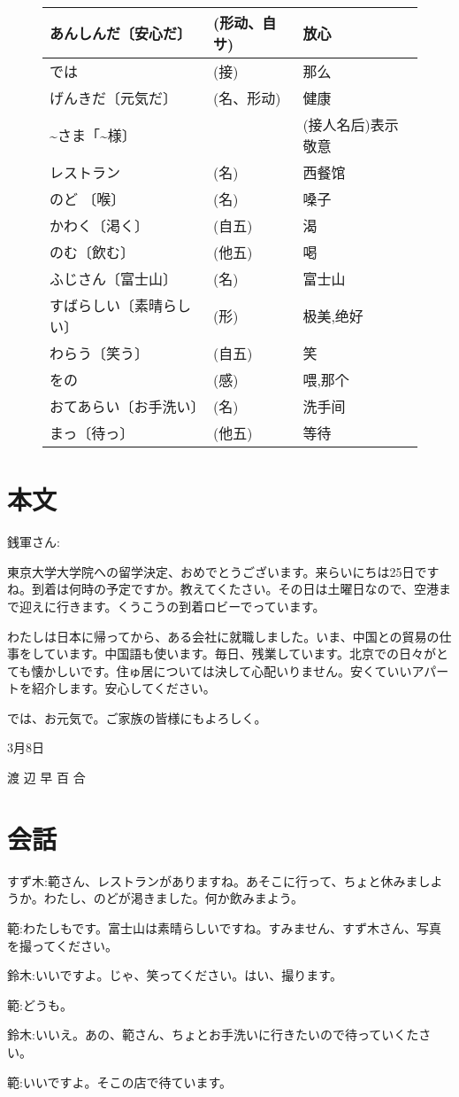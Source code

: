 \begin{figure}[htbp]
\begin{tabular}{l|l|l}
            あんしんだ〔安心だ〕 & (形动、自サ) & 放心\\\hline
            では & (接) & 那么\\\hline
            げんきだ〔元気だ〕 & (名、形动) & 健康\\\hline
            \~{}さま「\~{}様〕 &  & (接人名后)表示敬意\\\hline
            レストラン & (名) & 西餐馆\\\hline
            のど 〔喉〕 & (名) & 嗓子\\\hline
            かわく〔渇く〕 &  (自五) & 渴\\\hline
            のむ〔飲む〕 & (他五) & 喝\\\hline
            ふじさん〔富士山〕 & (名) & 富士山\\\hline
            すばらしい〔素晴らしい〕 & (形) & 极美,绝好\\\hline
            わらう〔笑う〕 &  (自五) & 笑\\\hline
            をの & (感) & 喂,那个\\\hline
            おてあらい〔お手洗い〕 & (名) & 洗手间\\\hline
            まっ〔待っ〕 &  (他五) & 等待
        \end{tabular}
    \end{figure}
    \section{本文}
    銭軍さん:

    東京大学大学院への留学決定、おめでとうございます。来らいにちは25日ですね。到着は何時の予定ですか。教えてくたさい。その日は土曜日なので、空港まで迎えに行きます。くうこうの到着ロビーでっています。

    わたしは日本に帰ってから、ある会社に就職しました。いま、中国との貿易の仕事をしています。中国語も使います。毎日、残業しています。北京での日々がとても懐かしいです。住ゅ居については決して心配いりません。安くていいアパートを紹介します。安心してください。

    では、お元気で。ご家族の皆様にもよろしく。

    3月8日

    渡
    辺
    早
    百
    合
    \section{会話}
    すず木:範さん、レストランがありますね。あそこに行って、ちょと休みましようか。わたし、のどが渇きました。何か飲みまよう。

    範:わたしもです。富士山は素晴らしいですね。すみません、すず木さん、写真を撮ってください。

    鈴木:いいですよ。じゃ、笑ってください。はい、撮ります。

    範:どうも。

    鈴木:いいえ。あの、範さん、ちょとお手洗いに行きたいので待っていくたさい。

    範:いいですよ。そこの店で待ています。

